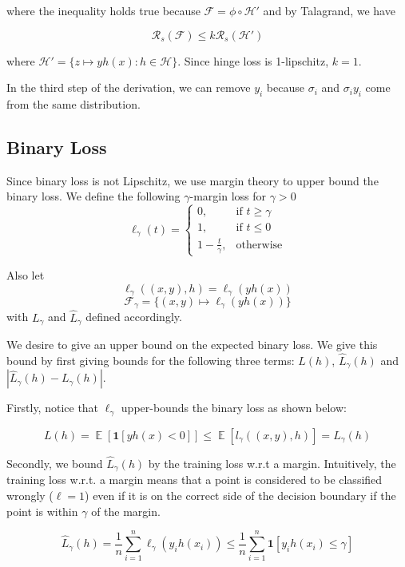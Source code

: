 \documentclass[11pt]{article}
\DeclareMathOperator*{\E}{\mathbb{E}}
\begin{document}
where the inequality holds true because $\mathcal{F} = \phi \circ \mathcal{H}'$ and by Talagrand, we have

\[ \mathcal{R}_s(\mathcal{F}) \leq k\mathcal{R}_s(\mathcal{H}') \]

where $\mathcal{H}' = \{ z \mapsto yh(x) : h \in \mathcal{H}\}$. Since hinge loss is 1-lipschitz, $k=1$.

In the third step of the derivation, we can remove $y_i$ because $\sigma_{i}$ and $\sigma_{i}y_i$ come from the same distribution.

\subsection{Binary Loss}

Since binary loss is not Lipschitz, we use margin theory to upper bound the binary loss. We define the following $\gamma$-margin loss for $\gamma > 0$
\[
    \ell_{\gamma}(t)= 
\begin{cases}
    0,& \text{if } t\geq \gamma\\
    1,& \text{if } t\leq 0\\
    1 - \frac{t}{\gamma},& \text{otherwise}
\end{cases}
\]

Also let
$$\ell_{\gamma}((x,y),h) = \ell_{\gamma}(yh(x))$$
$$\mathcal{F}_\gamma = \{(x,y) \mapsto \ell_\gamma(yh(x))\}$$
with $L_{\gamma}$ and $\hat{L}_{\gamma}$ defined accordingly.

We desire to give an upper bound on the expected binary loss. We give this bound by first giving bounds for the following three terms: $L(h)$, $\hat{L}_{\gamma}(h)$ and $|\hat{L}_{\gamma}(h) - L_{\gamma}(h)|$.

Firstly, notice that $\ell_{\gamma}$ upper-bounds the binary loss as shown below:

\begin{equation} \label{eq:14}
L(h) = \E\left[\mathbf{1}\left[yh(x)<0\right]\right] \leq \E\left[l_{\gamma}((x,y),h)\right] = L_{\gamma}(h)
\end{equation}

Secondly, we bound $\hat{L}_{\gamma}(h)$ by the training loss w.r.t a margin. Intuitively, the training loss w.r.t. a margin  means that a point is considered to be classified wrongly ($\ell=1$) even if it is on the correct side of the decision boundary if the point is within $\gamma$ of the margin.

\begin{equation} \label{eq:15}
    \hat{L}_{\gamma}(h) = \frac{1}{n} \sum_{i=1}^{n} \ell_{\gamma}(y_{i}h(x_i)) \leq \frac{1}{n} \sum_{i=1}^n \mathbf{1}\left[y_{i}h(x_i) \leq \gamma \right]
\end{equation}
\end{document}
